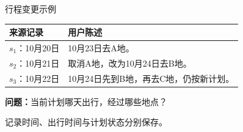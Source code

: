 \begin{frame}{行程变更示例}
    \begin{tabularx}{\linewidth}{@{}>{\raggedright\arraybackslash}p{27mm}Y@{}}
        \toprule
        来源记录 & 用户陈述 \\
        \midrule
        $s_1$：10月20日 & 10月23日去A地。\\[3mm]
        $s_2$：10月21日 & 取消A地，改为10月24日去B地。\\[3mm]
        $s_3$：10月22日 & 10月24日先到B地，再去C地，仍按新计划。\\
        \bottomrule
    \end{tabularx}\par
    \vspace{4mm}\textbf{问题：}当前计划哪天出行，经过哪些地点？\par
    \vspace{3mm}
    \par\vspace{3mm}记录时间、出行时间与计划状态分别保存。\par
\end{frame}

